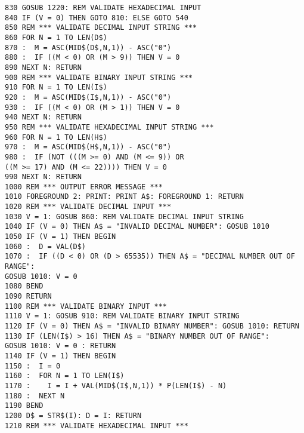 \begin{tcolorbox}[colback=black,coltext=white]
\verbatimfont{\codefont}
\begin{verbatim}
830 GOSUB 1220: REM VALIDATE HEXADECIMAL INPUT
840 IF (V = 0) THEN GOTO 810: ELSE GOTO 540
850 REM *** VALIDATE DECIMAL INPUT STRING ***
860 FOR N = 1 TO LEN(D$)
870 :  M = ASC(MID$(D$,N,1)) - ASC("0")
880 :  IF ((M < 0) OR (M > 9)) THEN V = 0
890 NEXT N: RETURN
900 REM *** VALIDATE BINARY INPUT STRING ***
910 FOR N = 1 TO LEN(I$)
920 :  M = ASC(MID$(I$,N,1)) - ASC("0")
930 :  IF ((M < 0) OR (M > 1)) THEN V = 0
940 NEXT N: RETURN
950 REM *** VALIDATE HEXADECIMAL INPUT STRING ***
960 FOR N = 1 TO LEN(H$)
970 :  M = ASC(MID$(H$,N,1)) - ASC("0")
980 :  IF (NOT (((M >= 0) AND (M <= 9)) OR
((M >= 17) AND (M <= 22)))) THEN V = 0
990 NEXT N: RETURN
1000 REM *** OUTPUT ERROR MESSAGE ***
1010 FOREGROUND 2: PRINT: PRINT A$: FOREGROUND 1: RETURN
1020 REM *** VALIDATE DECIMAL INPUT ***
1030 V = 1: GOSUB 860: REM VALIDATE DECIMAL INPUT STRING
1040 IF (V = 0) THEN A$ = "INVALID DECIMAL NUMBER": GOSUB 1010
1050 IF (V = 1) THEN BEGIN
1060 :  D = VAL(D$)
1070 :  IF ((D < 0) OR (D > 65535)) THEN A$ = "DECIMAL NUMBER OUT OF RANGE":
GOSUB 1010: V = 0
1080 BEND
1090 RETURN
1100 REM *** VALIDATE BINARY INPUT ***
1110 V = 1: GOSUB 910: REM VALIDATE BINARY INPUT STRING
1120 IF (V = 0) THEN A$ = "INVALID BINARY NUMBER": GOSUB 1010: RETURN
1130 IF (LEN(I$) > 16) THEN A$ = "BINARY NUMBER OUT OF RANGE":
GOSUB 1010: V = 0 : RETURN
1140 IF (V = 1) THEN BEGIN
1150 :  I = 0
1160 :  FOR N = 1 TO LEN(I$)
1170 :    I = I + VAL(MID$(I$,N,1)) * P(LEN(I$) - N)
1180 :  NEXT N
1190 BEND
1200 D$ = STR$(I): D = I: RETURN
1210 REM *** VALIDATE HEXADECIMAL INPUT ***
\end{verbatim}
\end{tcolorbox}
